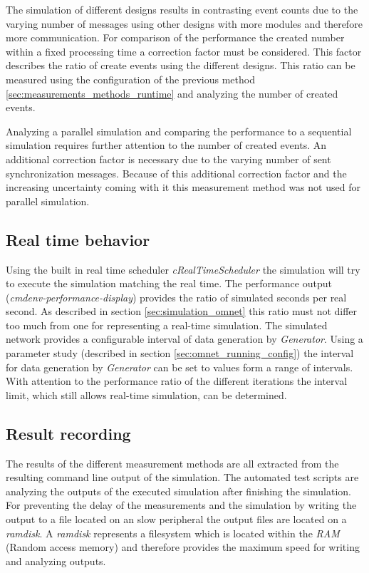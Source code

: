 The simulation of different designs results in contrasting event counts due to the varying number of messages using other designs with more modules and therefore more communication.
For comparison of the performance the created number within a fixed processing time a correction factor must be considered.
This factor describes the ratio of create events using the different designs.
This ratio can be measured using the configuration of the previous method \ref{sec:measurements_methods_runtime} and analyzing the number of created events.

Analyzing a parallel simulation and comparing the performance to a sequential simulation requires further attention to the number of created events.
An additional correction factor is necessary due to the varying number of sent synchronization messages.
Because of this additional correction factor and the increasing uncertainty coming with it this measurement method was not used for parallel simulation.

\subsection{Real time behavior}
\label{sec:measurements_methods_realtime}
Using the built in real time scheduler \emph{cRealTimeScheduler} the simulation will try to execute the simulation matching the real time.
The performance output (\emph{cmdenv-performance-display}) provides the ratio of simulated seconds per real second.
As described in section \ref{sec:simulation_omnet} this ratio must not differ too much from one for representing a real-time simulation.
The simulated network provides a configurable interval of data generation by \emph{Generator}.
Using a parameter study (described in section \ref{sec:omnet_running_config}) the interval for data generation by \emph{Generator} can be set to values form a range of intervals.
With attention to the performance ratio of the different iterations the interval limit, which still allows real-time simulation, can be determined.

\subsection{Result recording}
The results of the different measurement methods are all extracted from the resulting command line output of the simulation.
The automated test scripts are analyzing the outputs of the executed simulation after finishing the simulation.
For preventing the delay of the measurements and the simulation by writing the output to a file located on an slow peripheral the output files are located on a \emph{ramdisk}.
A \emph{ramdisk} represents a filesystem which is located within the \emph{RAM} (Random access memory) and therefore provides the maximum speed for writing and analyzing outputs.

